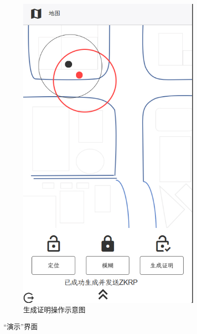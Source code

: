 \documentclass[zihao=-4]{ctexart}
\begin{document}
\begin{figure}[htbp]
  \begin{subfigure}{0.31\textwidth}
    \includegraphics[width=\linewidth]{前端-生成证明.jpg}
    \caption{生成证明操作示意图} 
    \end{subfigure}
\caption{“演示”界面}
\label{演示界面}
\end{figure}
\end{document}
